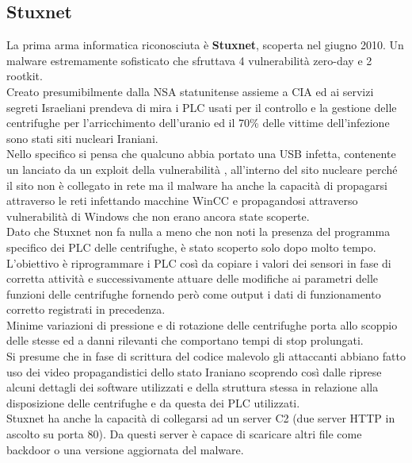 \subsection{Stuxnet}
La prima arma informatica riconosciuta è \textbf{Stuxnet}, scoperta nel giugno 2010.
Un malware estremamente sofisticato che sfruttava 4 vulnerabilità zero-day e 2 rootkit.\\
Creato presumibilmente dalla \acrfull{NSA} statunitense assieme a \acrfull{CIA} ed ai servizi segreti Israeliani prendeva di mira i \acrfull{PLC} usati per il controllo e la gestione delle centrifughe per l'arricchimento dell'uranio ed il 70\% delle vittime dell'infezione sono stati siti nucleari Iraniani.\\
Nello specifico si pensa che qualcuno abbia portato una USB infetta, contenente un  lanciato da un exploit della vulnerabilità , all'interno del sito nucleare perché il sito non è collegato in rete ma il malware ha anche la capacità di propagarsi attraverso le reti infettando macchine WinCC e propagandosi attraverso vulnerabilità di Windows che non erano ancora state scoperte.\\
Dato che Stuxnet non fa nulla a meno che non noti la presenza del programma specifico dei \acrshort{PLC} delle centrifughe, è stato scoperto solo dopo molto tempo.\\
L'obiettivo è riprogrammare i \acrshort{PLC} così da copiare i valori dei sensori in fase di corretta attività e successivamente attuare delle modifiche ai parametri delle funzioni delle centrifughe fornendo però come output i dati di funzionamento corretto registrati in precedenza.\\
Minime variazioni di pressione e di rotazione delle centrifughe porta allo scoppio delle stesse ed a danni rilevanti che comportano tempi di stop prolungati.\\
Si presume che in fase di scrittura del codice malevolo gli attaccanti abbiano fatto uso dei video propagandistici dello stato Iraniano scoprendo così dalle riprese alcuni dettagli dei software utilizzati e della struttura stessa in relazione alla disposizione delle centrifughe e da questa dei \acrshort{PLC} utilizzati.\\
Stuxnet ha anche la capacità di collegarsi ad un server \acrshort{C2} (due server HTTP in ascolto su porta 80).
Da questi server è capace di scaricare altri file come backdoor o una versione aggiornata del malware.

